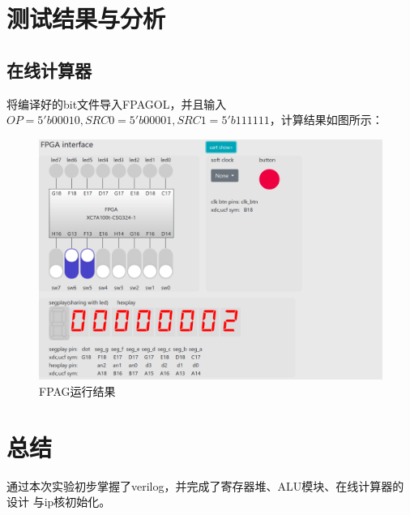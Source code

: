 \documentclass[12pt,a4paper]{ctexart}
\begin{document}
\section{测试结果与分析}
\subsection{在线计算器}
将编译好的bit文件导入FPAGOL，并且输入
$OP=5'b00010,SRC0=5'b00001,SRC1=5'b111111$，计算结果如图所示：
\newpage
\begin{center}
    \begin{figure}[t]
        \includegraphics[scale=0.5]{pic/2024-04-04_00-00.png}
        \caption{FPAG运行结果}
    \end{figure}
\end{center}
\section{总结}
通过本次实验初步掌握了verilog，并完成了寄存器堆、ALU模块、在线计算器的设计
与ip核初始化。
\end{document}
